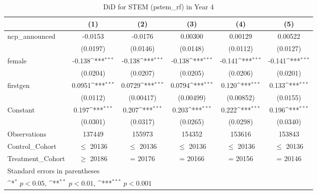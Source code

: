 \begin{table}[htbp]\centering
\def\sym#1{\ifmmode^{#1}\else\(^{#1}\)\fi}
\caption{DiD for STEM (pstem\_rf) in Year 4}
\begin{tabular}{l*{5}{c}}
\toprule
                &\multicolumn{1}{c}{(1)}         &\multicolumn{1}{c}{(2)}         &\multicolumn{1}{c}{(3)}         &\multicolumn{1}{c}{(4)}         &\multicolumn{1}{c}{(5)}         \\
\midrule
ncp\_announced   &  -0.0153         &  -0.0176         &  0.00300         &  0.00129         &  0.00522         \\
                & (0.0197)         & (0.0146)         & (0.0148)         & (0.0112)         & (0.0127)         \\
\addlinespace
female          &   -0.138\sym{***}&   -0.138\sym{***}&   -0.138\sym{***}&   -0.141\sym{***}&   -0.141\sym{***}\\
                & (0.0204)         & (0.0207)         & (0.0205)         & (0.0206)         & (0.0201)         \\
\addlinespace
firstgen        &   0.0951\sym{***}&   0.0729\sym{***}&   0.0794\sym{***}&    0.120\sym{***}&    0.133\sym{***}\\
                & (0.0112)         &(0.00417)         &(0.00499)         &(0.00852)         & (0.0155)         \\
\addlinespace
Constant        &    0.197\sym{***}&    0.207\sym{***}&    0.203\sym{***}&    0.222\sym{***}&    0.196\sym{***}\\
                & (0.0301)         & (0.0317)         & (0.0265)         & (0.0298)         & (0.0340)         \\
\midrule
Observations    &   137449         &   155973         &   154352         &   153616         &   153843         \\
Control\_Cohort  &$\le$ 20136         &$\le$ 20136         &$\le$ 20136         &$\le$ 20136         &$\le$ 20136         \\
Treatment\_Cohort&$\ge$ 20186         &  = 20176         &  = 20166         &  = 20156         &  = 20146         \\
\bottomrule
\multicolumn{6}{l}{\footnotesize Standard errors in parentheses}\\
\multicolumn{6}{l}{\footnotesize \sym{*} \(p<0.05\), \sym{**} \(p<0.01\), \sym{***} \(p<0.001\)}\\
\end{tabular}
\end{table}
